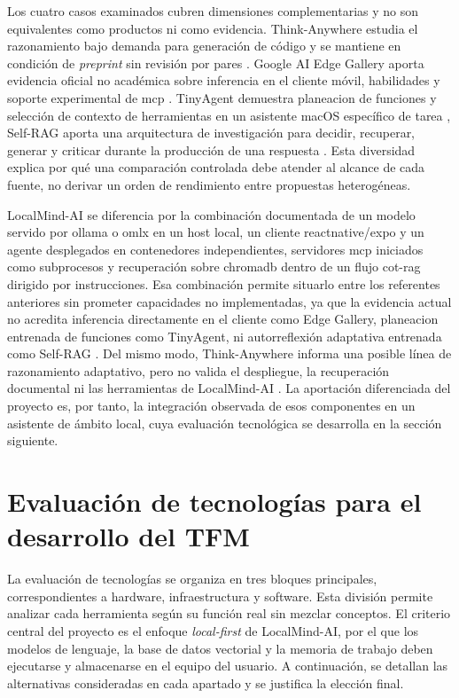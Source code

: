 Los cuatro casos examinados cubren dimensiones complementarias y no son equivalentes como productos ni como evidencia. Think-Anywhere estudia el razonamiento bajo demanda para generación de código y se mantiene en condición de \emph{preprint} sin revisión por pares \cite{jiang2026thinkanywhere}. Google AI Edge Gallery aporta evidencia oficial no académica sobre inferencia en el cliente móvil, habilidades y soporte experimental de \gls{mcp} \cite{google2026aiedgegallery}. TinyAgent demuestra \gls{planeacion} de funciones y selección de contexto de herramientas en un asistente macOS específico de tarea \cite{erdogan2024tinyagent}, Self-RAG aporta una arquitectura de investigación para decidir, recuperar, generar y criticar durante la producción de una respuesta \cite{asai2024selfrag}. Esta diversidad explica por qué una comparación controlada debe atender al alcance de cada fuente, no derivar un orden de rendimiento entre propuestas heterogéneas.

LocalMind-AI se diferencia por la combinación documentada de un modelo servido por \gls{ollama} o \gls{omlx} en un host local, un cliente \gls{reactnative}/\gls{expo} y un agente desplegados en contenedores independientes, servidores \gls{mcp} iniciados como subprocesos y recuperación sobre \gls{chromadb} dentro de un flujo \gls{cot}-\gls{rag} dirigido por instrucciones. Esa combinación permite situarlo entre los referentes anteriores sin prometer capacidades no implementadas, ya que la evidencia actual no acredita inferencia directamente en el cliente como Edge Gallery, \gls{planeacion} entrenada de funciones como TinyAgent, ni autorreflexión adaptativa entrenada como Self-RAG \cite{google2026aiedgegallery,erdogan2024tinyagent,asai2024selfrag}. Del mismo modo, Think-Anywhere informa una posible línea de razonamiento adaptativo, pero no valida el despliegue, la recuperación documental ni las herramientas de LocalMind-AI \cite{jiang2026thinkanywhere}. La aportación diferenciada del proyecto es, por tanto, la integración observada de esos componentes en un asistente de ámbito local, cuya evaluación tecnológica se desarrolla en la sección siguiente.

\section{Evaluación de tecnologías para el desarrollo del TFM}\label{sec:evaluacion-tecnologias}

La evaluación de tecnologías se organiza en tres bloques principales, correspondientes a hardware, infraestructura y software. Esta división permite analizar cada herramienta según su función real sin mezclar conceptos. El criterio central del proyecto es el enfoque \emph{local-first} de LocalMind-AI, por el que los modelos de lenguaje, la base de datos vectorial y la memoria de trabajo deben ejecutarse y almacenarse en el equipo del usuario. A continuación, se detallan las alternativas consideradas en cada apartado y se justifica la elección final.

